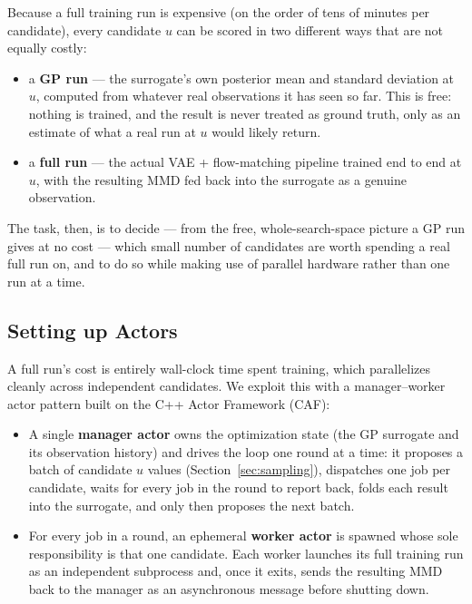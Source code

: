 \documentclass[11pt]{article}
\begin{document}
Because a full training run is expensive (on the order of tens of minutes
per candidate), every candidate $u$ can be scored in two different ways
that are not equally costly:
\begin{itemize}
  \item a \textbf{GP run} — the surrogate's own posterior mean and
    standard deviation at $u$, computed from whatever real observations
    it has seen so far. This is free: nothing is trained, and the result
    is never treated as ground truth, only as an estimate of what a real
    run at $u$ would likely return.
  \item a \textbf{full run} — the actual VAE + flow-matching pipeline
    trained end to end at $u$, with the resulting MMD fed back into the
    surrogate as a genuine observation.
\end{itemize}
The task, then, is to decide — from the free, whole-search-space picture
a GP run gives at no cost — which small number of candidates are worth
spending a real full run on, and to do so while making use of parallel
hardware rather than one run at a time.

\subsection{Setting up Actors}
\label{sec:actors}

A full run's cost is entirely wall-clock time spent training, which
parallelizes cleanly across independent candidates. We exploit this with
a manager–worker actor pattern built on the C++ Actor Framework (CAF):

\begin{itemize}
  \item A single \textbf{manager actor} owns the optimization state (the
    GP surrogate and its observation history) and drives the loop one
    round at a time: it proposes a batch of candidate $u$ values
    (Section~\ref{sec:sampling}), dispatches one job per candidate, waits
    for every job in the round to report back, folds each result into the
    surrogate, and only then proposes the next batch.
  \item For every job in a round, an ephemeral \textbf{worker actor} is
    spawned whose sole responsibility is that one candidate. Each worker
    launches its full training run as an independent subprocess and,
    once it exits, sends the resulting MMD back to the manager as an
    asynchronous message before shutting down.
\end{itemize}
\end{document}
